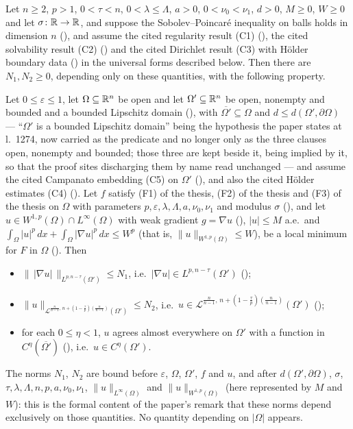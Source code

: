\begin{theorem}[Theorem 3]
Let $n\ge2$, $p>1$, $0<\tau<n$, $0<\lambda\le\Lambda$, $a>0$,
$0<\nu_0<\nu_1$, $d>0$, $M\ge0$, $W\ge0$ and let $\sigma\colon\mathbb{R}\to\mathbb{R}$, and suppose the Sobolev--Poincar\'e inequality on balls holds in dimension $n$
(), and assume the cited regularity result
(C1) (), the cited solvability result (C2)
() and the cited Dirichlet result (C3) with H\"older
boundary data () in the universal forms described
below.  Then
there are $N_1,N_2\ge0$, depending only on these quantities, with the following
property.

Let $0\le\varepsilon\le1$, let $\Omega\subseteq\mathbb{R}^n$ be open and let
$\Omega'\subseteq\mathbb{R}^n$ be open, nonempty and bounded and a bounded Lipschitz
domain (), with
$\overline{\Omega'}\subseteq\Omega$ and $d\le d(\Omega',\partial\Omega)$ --- ``$\Omega'$ is a bounded Lipschitz domain'' being the hypothesis the paper states at l.~1274, now carried as the predicate  and no longer only as the three clauses open, nonempty and bounded; those three are kept beside it, being implied by it, so that the proof sites discharging them by name read unchanged ---
and assume the cited Campanato embedding (C5) on
$\Omega'$ (), and also the cited
H\"older estimates (C4) ().  Let $f$ satisfy
(F1) of the thesis, (F2) of the thesis and (F3) of the thesis on $\Omega$ with parameters
$p,\varepsilon,\lambda,\Lambda,a,\nu_0,\nu_1$ and modulus $\sigma$
(), and let
$u\in W^{1,p}(\Omega)\cap L^\infty(\Omega)$ with weak gradient $g=\nabla u$
(), $|u|\le M$ a.e.\ and
$\int_\Omega|u|^p\,dx+\int_\Omega|\nabla u|^p\,dx\le W^p$ (that is,
$\|u\|_{W^{1,p}(\Omega)}\le W$), be a local minimum for $F$ in
$\Omega$ ().  Then
\begin{itemize}
\item[(i)] $\|\,|\nabla u|\,\|_{L^{p,n-\tau}(\Omega')}\le N_1$, i.e.\
  $|\nabla u|\in L^{p,n-\tau}(\Omega')$ ();
\item[(ii)] $\|u\|_{\mathcal L^{\frac n{n-1},\,n+(1-\frac\tau p)(\frac n{n-1})}(\Omega')}\le N_2$,
  i.e.\ $u\in\mathcal L^{\frac n{n-1},\,n+(1-\frac\tau p)(\frac n{n-1})}(\Omega')$
  (\noderef{CampanatoBoundOn});
\item[(iii)] for each $0\le\eta<1$, $u$ agrees almost everywhere on $\Omega'$
  with a function in $C^\eta(\overline{\Omega'})$ (\noderef{MemHolderOn}), i.e.\
  $u\in C^\eta(\Omega')$.
\end{itemize}
The norms $N_1$, $N_2$ are bound before $\varepsilon$, $\Omega$, $\Omega'$, $f$
and $u$, and after $d(\Omega',\partial\Omega)$, $\sigma$,
$\tau,\lambda,\Lambda,n,p,a,\nu_0,\nu_1$, $\|u\|_{L^\infty(\Omega)}$ and
$\|u\|_{W^{1,p}(\Omega)}$ (here represented by $M$ and $W$): this is the formal
content of the paper's remark that these norms depend exclusively on those
quantities.  No quantity depending on $|\Omega|$ appears.


\end{theorem}
